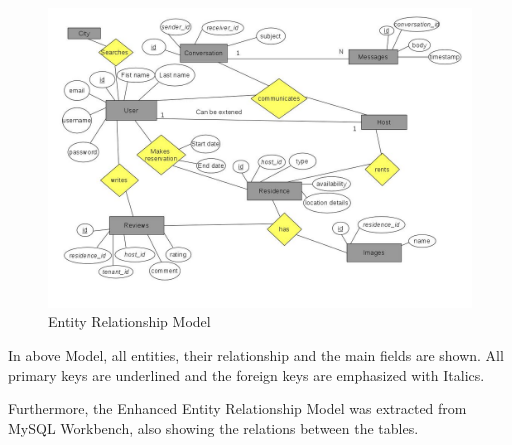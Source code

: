 \documentclass[12pt]{article}
\begin{document}
	\begin{figure} [H]
		\begin{center}
			\includegraphics [scale = 0.55] {MonteloOntotitonSusxetiseon.jpg}
			\caption{Entity Relationship Model}
		\end{center}
	\end{figure}
	In above Model, all entities, their relationship and the main fields are shown. All primary keys are underlined and the foreign keys are emphasized with Italics. 
	
	Furthermore, the Enhanced Entity Relationship Model was extracted from MySQL Workbench, also showing the relations between the tables. 
	
\end{document}
